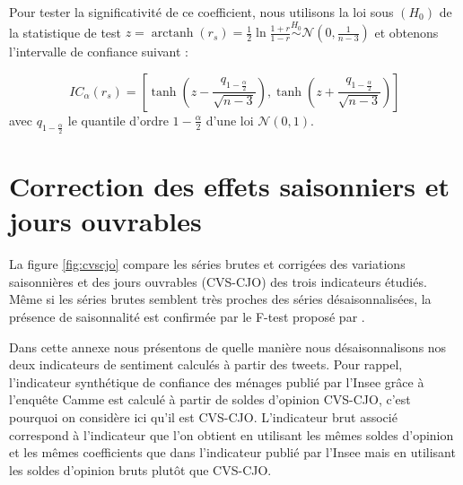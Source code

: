 \documentclass[11pt,french,french]{article}
\DeclareMathOperator{\arctanh}{arctanh}
\begin{document}
Pour tester la significativité de ce coefficient, nous utilisons la loi
sous \((H_0)\) de la statistique de test
\(z = \arctanh(r_s) = \frac{1}{2} \ln\frac{1+r}{1-r} \overset{H_0}{\sim}\mathcal{N}(0, \frac{1}{n-3})\)
et obtenons l'intervalle de confiance suivant :

\[
IC_\alpha (r_s) = \left[\tanh\left(z-\frac{q_{1-\frac{\alpha}{2}}}{\sqrt{n-3}}\right),
\tanh\left(z+\frac{q_{1-\frac{\alpha}{2}}}{\sqrt{n-3}}\right)\right]
\] avec \(q_{1-\frac{\alpha}{2}}\) le quantile d'ordre
\(1-\frac{\alpha}{2}\) d'une loi \(\mathcal{N}(0, 1)\).

\newpage

\section{Correction des effets saisonniers et jours
ouvrables}\label{annexe:cvscjo}

La figure \ref{fig:cvscjo} compare les séries brutes et corrigées des
variations saisonnières et des jours ouvrables (CVS-CJO) des trois
indicateurs étudiés. Même si les séries brutes semblent très proches des
séries désaisonnalisées, la présence de saisonnalité est confirmée par
le F-test proposé par \cite{lytras}.

Dans cette annexe nous présentons de quelle manière nous
désaisonnalisons nos deux indicateurs de sentiment calculés à partir des
tweets. Pour rappel, l'indicateur synthétique de confiance des ménages
publié par l'Insee grâce à l'enquête Camme est calculé à partir de
soldes d'opinion CVS-CJO, c'est pourquoi on considère ici qu'il est
CVS-CJO. L'indicateur brut associé correspond à l'indicateur que l'on
obtient en utilisant les mêmes soldes d'opinion et les mêmes
coefficients que dans l'indicateur publié par l'Insee mais en utilisant
les soldes d'opinion bruts plutôt que CVS-CJO.
\end{document}
